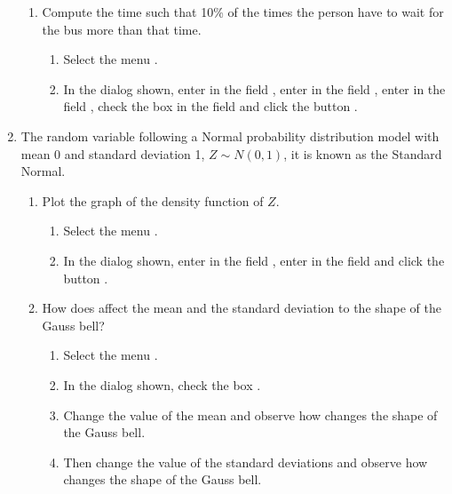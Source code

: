 \begin{enumerate}[leftmargin=*]
\begin{enumerate}
\item Compute the time such that 10\% of the times the person have to wait for the bus more than that time.
\begin{indication}
\begin{enumerate}
\item Select the menu .
\item In the dialog shown, enter  in the field ,
enter  in the field , enter  in the field , check the box  in the field  and click the button .
\end{enumerate}
\end{indication}
\end{enumerate}


\item The random variable following a Normal probability distribution model with mean 0 and standard deviation 1, $Z\sim N(0,1)$, it is known as the Standard Normal.  
\begin{enumerate}
\item Plot the graph of the density function of $Z$.
\begin{indication}
\begin{enumerate}
\item Select the menu .
\item In the dialog shown, enter  in the field , enter  in the field  and click the button .
\end{enumerate}
\end{indication}

\item How does affect the mean and the standard deviation to the shape of the Gauss bell?
\begin{indication}
\begin{enumerate}
\item Select the menu .
\item In the dialog shown, check the box .
\item Change the value of the mean and observe how changes the shape of the Gauss bell.
\item Then change the value of the standard deviations and observe how changes the shape of the Gauss bell.
\end{enumerate}
\end{indication}


\end{enumerate}
\end{enumerate}
